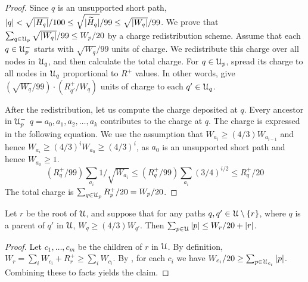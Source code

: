 {\begin{proof} Since $q$ is an unsupported short path, $|q| < \sqrt{|H_q|}/100 \leq \sqrt{|\widetilde{H}_q|}/99 \leq \sqrt{|W_q|}/99$.
We prove that $\sum_{q \in {\cal U}_p} \sqrt{|W_q|}/99 \leq W_p/20$
by a charge redistribution scheme. Assume that each $q \in {\cal U}_p^-$
starts with $\sqrt{W_q}/99$ units of charge. We redistribute this charge over all
nodes in ${\cal U}_q$, and then calculate the total charge. For $q \in {\cal U}_p$, spread
its charge to all nodes in ${\cal U}_q$ proportional to $R^+$ values. In other words,
give $(\sqrt{W_q}/99)\cdot(R^+_{q'}/W_q)$ units of charge to each $q' \in {\cal U}_q$.

After the redistribution, let us compute the charge deposited at $q$. Every ancestor in ${\cal U}_p^-$ 
$q = a_0, a_1, a_2, \ldots, a_k$ contributes to the charge at $q$. The charge is expressed in the following
equation. We use the assumption that $W_{a_i} \geq (4/3) W_{a_{i-1}}$ and hence $W_{a_i} \geq (4/3)^i W_{a_0} \geq (4/3)^i$, 
as $a_0$ is an unsupported short path and hence $W_{a_0}\geq 1$. 
$$ ({R^+_q}/99)\sum_{a_i} 1/\sqrt{W_{a_i}} \leq ({R^+_q}/99)\sum_{a_i} (3/4)^{i/2} \leq R^+_q/20 $$
The total charge is $\sum_{q \in {\cal U}_p} R^+_p/20 = W_p/20$. 
\end{proof}

\begin{corollary} \label{cor:chargeCor}
 Let $r$ be the root of ${\cal U}$, and suppose that for any paths $q,q' \in {\cal U}\setminus \{r\}$, where $q$ is a parent of $q'$ in ${\cal U}$, $W_q \geq (4/3)W_{q'}$.
 Then $\sum_{p \in {\cal U}} |p| \leq W_r/20+|r|$.
\end{corollary}
\begin{proof}
 Let $c_1, \dots, c_m$ be the children of $r$ in ${\cal U}$.  By definition, $W_r = \sum_i W_{c_i}+R^+_r \geq \sum_i W_{c_i}$.
 By , for each $c_i$ we have $W_{c_i}/20\geq \sum_{p \in {\cal U}_{c_i}} |p|$.  Combining these to facts yields the claim.
\end{proof}




}
